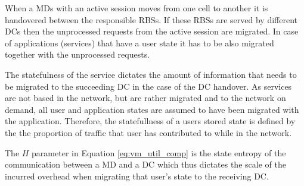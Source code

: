 


When a \ac{MD}s with an active session moves from one cell to another it is handovered between the responsible \ac{RBS}s.
If these \ac{RBS}s are served by different \ac{DC}s then the unprocessed requests from the active session are migrated.
In case of applications (services) that have a user state it has to be also migrated together with the unprocessed requests.

The statefulness of the service dictates the amount of information that needs to be migrated to the succeeding \ac{DC} in the case of the \ac{DC} handover. As services are not based in the network, but are rather migrated and to the \xcloud{} network on demand, all user and application states are assumed to have been migrated with the application. Therefore, the statefullness of a users stored state is defined by the the proportion of traffic that user has contributed to while in the network.

The $H$ parameter in Equation \ref{eq:vm_util_comp} is the state entropy of the communication between a \ac{MD} and a \ac{DC} which thus dictates the scale of the incurred overhead when migrating that user's state  to the receiving \ac{DC}.